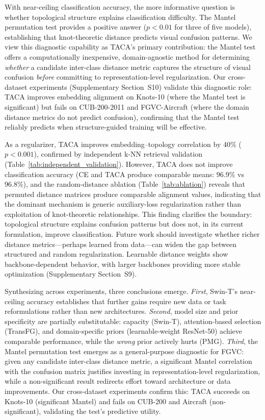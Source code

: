 \documentclass[preprint,review,12pt]{elsarticle}
\begin{document}
With near-ceiling classification accuracy, the more informative question is whether topological structure explains classification difficulty. The Mantel permutation test provides a positive answer ($p < 0.01$ for three of five models), establishing that knot-theoretic distance predicts visual confusion patterns. We view this diagnostic capability as TACA's primary contribution: the Mantel test offers a computationally inexpensive, domain-agnostic method for determining \emph{whether} a candidate inter-class distance metric captures the structure of visual confusion \emph{before} committing to representation-level regularization. Our cross-dataset experiments (Supplementary Section~S10) validate this diagnostic role: TACA improves embedding alignment on Knots-10 (where the Mantel test is significant) but fails on CUB-200-2011 and FGVC-Aircraft (where the domain distance metrics do not predict confusion), confirming that the Mantel test reliably predicts when structure-guided training will be effective.

As a regularizer, TACA improves embedding--topology correlation by 40\% ($p < 0.001$), confirmed by independent k-NN retrieval validation (Table~\ref{tab:independent_validation}). However, TACA does not improve classification accuracy (CE and TACA produce comparable means: $96.9\%$ vs $96.8\%$), and the random-distance ablation (Table~\ref{tab:ablation}) reveals that permuted distance matrices produce comparable alignment values, indicating that the dominant mechanism is generic auxiliary-loss regularization rather than exploitation of knot-theoretic relationships. This finding clarifies the boundary: topological structure explains confusion patterns but does not, in its current formulation, improve classification. Future work should investigate whether richer distance metrics---perhaps learned from data---can widen the gap between structured and random regularization. Learnable distance weights show backbone-dependent behavior, with larger backbones providing more stable optimization (Supplementary Section~S9).

Synthesizing across experiments, three conclusions emerge. \emph{First}, Swin-T's near-ceiling accuracy establishes that further gains require new data or task reformulations rather than new architectures. \emph{Second}, model size and prior specificity are partially substitutable: capacity (Swin-T), attention-based selection (TransFG), and domain-specific priors (learnable-weight ResNet-50) achieve comparable performance, while the \emph{wrong} prior actively hurts (PMG). \emph{Third}, the Mantel permutation test emerges as a general-purpose diagnostic for FGVC: given any candidate inter-class distance metric, a significant Mantel correlation with the confusion matrix justifies investing in representation-level regularization, while a non-significant result redirects effort toward architecture or data improvements. Our cross-dataset experiments confirm this: TACA succeeds on Knots-10 (significant Mantel) and fails on CUB-200 and Aircraft (non-significant), validating the test's predictive utility.
\end{document}
